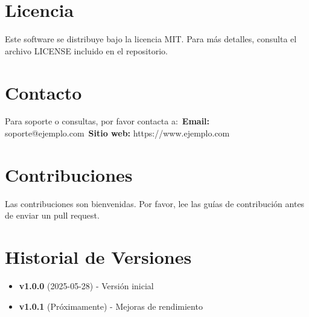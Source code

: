 \documentclass{article}
\begin{document}
\section{Licencia}
Este software se distribuye bajo la licencia MIT. Para más detalles, consulta el archivo LICENSE incluido en el repositorio.

\section{Contacto}
Para soporte o consultas, por favor contacta a:\
\textbf{Email:} soporte@ejemplo.com\
\textbf{Sitio web:} https://www.ejemplo.com

\section{Contribuciones}
Las contribuciones son bienvenidas. Por favor, lee las guías de contribución antes de enviar un pull request.

\section{Historial de Versiones}
\begin{itemize}
    \item \textbf{v1.0.0} (2025-05-28) - Versión inicial
    \item \textbf{v1.0.1} (Próximamente) - Mejoras de rendimiento
\end{itemize}
\end{document}
